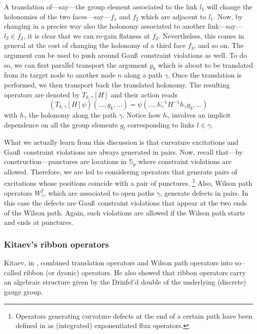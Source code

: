 \documentclass[nofootinbib,superscriptaddress,eqsecnum,tightenlines,11pt]{revtex4-1}
\def\be{\begin{equation}}
\def\ee{\end{equation}}
\renewcommand{\S}{{\mathbb S}}
\begin{document}
A translation of---say---the group element associated to  the link $l_1$ will change the holonomies of the two faces---say---$f_1$ and $f_2$ which are adjacent to $l_1$. 
Now, by changing in a precise way also the holonomy associated to another link---say---$l_2 \in f_2$, it is clear that we can re-gain flatness at $f_2$. 
Nevertheless, this comes in general at the cost of changing the holonomy of a third face $f_3$, and so on.
The argument can be used to push around Gau\ss~constraint violations as well. To do so, we can first parallel transport the argument $g_k$ which is about to be translated from its target node to another node $n$ along a path $\gamma$. Once the translation is performed, we then transport back the translated holonomy. The resulting operators are denoted by $T_{k,\gamma}[H]$ and their action reads
\be
	(T_{k,\gamma}[H]\psi)(\ldots,g_k,\ldots) = \psi (\ldots, h_{\gamma}^{-1}H^{-1}h_{\gamma}g_k, \ldots)
\ee
with $h_{\gamma}$ the holonomy along the path $\gamma$.  Notice how $h_\gamma$ involves an implicit dependence on all the group elements $g_l$ corresponding to links $l \in \gamma$.




What we actually learn from this discussion is that curvature excitations and Gau\ss~constraint violations are always generated in pairs. Now, recall that---by construction---punctures are locations in $\S_p$ where constraint violations are allowed.
Therefore, we are led to considering operators that generate pairs of excitations whose positions coincide with a pair of punctures.%
\footnote{Operators generating curvature defects at the end of a certain path have been defined in \cite{DG14a,DG14b,BDG15} as (integrated) exponentiated flux operators.}
Also, Wilson path operators $W^f_\gamma$, which are associated to open paths $\gamma$, generate defects in pairs.
In this case the defects are Gau\ss~constraint violations that appear at the two ends of the Wilson path. 
Again, such violations are allowed if the Wilson path starts and ends at punctures.

\subsubsection{Kitaev's ribbon operators}

Kitaev, in \cite{Kitaev1}, combined translation operators and Wilson path operators into so--called ribbon (or dyonic) operators. 
He also showed that ribbon operators carry an algebraic structure given by the Drinfel'd double of the underlying (discrete) gauge group. 
\end{document}

